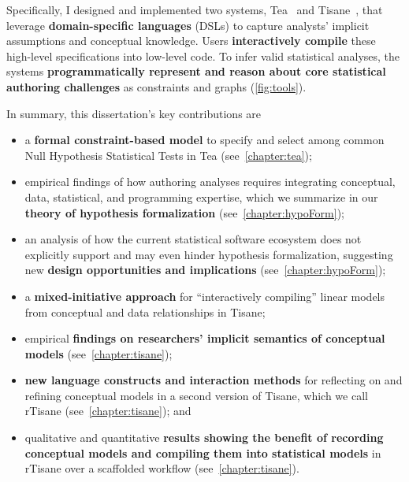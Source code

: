 Specifically, I designed and implemented two systems, Tea~\cite{jun2019tea} and
Tisane~\cite{jun2022tisane}, that leverage \textbf{domain-specific languages}
(DSLs) to capture analysts' implicit assumptions and conceptual knowledge. Users
\textbf{interactively compile} these high-level specifications into low-level
code. To infer valid statistical analyses, the systems \textbf{programmatically
represent and reason about core statistical authoring challenges} as constraints
and graphs (\autoref{fig:tools}).

In summary, this dissertation's key contributions are
\begin{itemize} 
    \item a \textbf{formal constraint-based model} to specify and select among
    common Null Hypothesis Statistical Tests in Tea (see~\autoref{chapter:tea}); 
    \item empirical findings of how authoring analyses requires integrating
    conceptual, data, statistical, and programming expertise, which we summarize
    in our \textbf{theory of hypothesis formalization} (see~\autoref{chapter:hypoForm}); 
    \item an analysis of how the current statistical software ecosystem does not
    explicitly support and may even hinder hypothesis formalization, suggesting
    new \textbf{design opportunities and implications} (see~\autoref{chapter:hypoForm});
    \item a \textbf{mixed-initiative approach} for ``interactively compiling''
    linear models from conceptual and data relationships in Tisane; 
    \item empirical \textbf{findings on researchers' implicit semantics of
    conceptual models} (see~\autoref{chapter:tisane});
    \item \textbf{new language constructs and interaction methods} for
    reflecting on and refining conceptual models in a second version of Tisane,
    which we call rTisane (see~\autoref{chapter:tisane}); and
    \item qualitative and quantitative \textbf{results showing the benefit of
    recording conceptual models and compiling them into statistical models} in
    rTisane over a scaffolded workflow (see~\autoref{chapter:tisane}).
\end{itemize}


